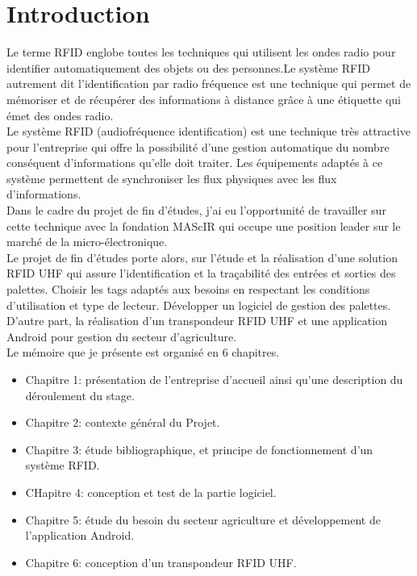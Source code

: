 \documentclass[11pt, a4paper, twoside]{book}
\begin{document}
\listoffigures

\listoftables

\chapter*{Introduction}
Le terme RFID englobe toutes les techniques qui utilisent les ondes radio pour identifier automatiquement des objets ou des personnes.Le système RFID autrement dit l'identification par radio fréquence est une technique qui permet de mémoriser et de récupérer des informations à distance grâce à une étiquette qui émet des ondes radio.\\

Le système RFID (audiofréquence identification) est une technique très attractive pour l'entreprise qui offre la possibilité d'une gestion automatique du nombre conséquent d'informations qu'elle doit traiter. Les équipements adaptés à ce système permettent de synchroniser les flux physiques avec les flux d'informations.\\

Dans le cadre du projet de fin d'études, j'ai eu l'opportunité de travailler sur cette technique avec la fondation MAScIR qui occupe une position leader sur le marché de la micro-électronique.\\

Le projet de fin d’études porte alors, sur l'étude et la réalisation d’une solution RFID UHF qui assure l’identification et la traçabilité des entrées et sorties des palettes. Choisir les tags adaptés aux besoins en respectant les conditions d’utilisation et type de lecteur. Développer un logiciel de gestion des palettes. D’autre part, la réalisation d’un transpondeur RFID UHF et une application Android pour gestion du secteur d'agriculture.\\


Le mémoire que je présente est organisé en 6 chapitres.

\begin{itemize}
\item Chapitre 1: présentation de l'entreprise d'accueil ainsi qu'une description du déroulement du stage.
\item Chapitre 2: contexte général du Projet.
\item Chapitre 3: étude bibliographique, et principe de fonctionnement d’un système RFID. 
\item CHapitre 4: conception et test de la partie logiciel.
\item Chapitre 5: étude du besoin du secteur agriculture et développement de l'application Android.
\item Chapitre 6: conception d'un transpondeur RFID UHF.
\end{itemize}
\end{document}
